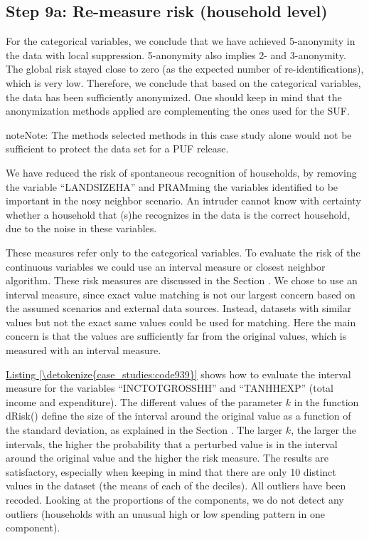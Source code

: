 \documentclass[letterpaper,10pt,english]{sphinxmanual}
\begin{document}
\subsection{Step 9a: Re-measure risk (household level)}
\label{\detokenize{case_studies:step-9a-re-measure-risk-household-level}}
For the categorical variables, we conclude that we have achieved
5-anonymity in the data with local suppression. 5-anonymity also implies
2- and 3-anonymity. The global risk stayed close to zero (as the
expected number of re-identifications), which is very low. Therefore, we
conclude that based on the categorical variables, the data has been
sufficiently anonymized. One should keep in mind that the anonymization
methods applied are complementing the ones used for the SUF.

\begin{sphinxadmonition}{note}{Note:}
The methods selected methods in this case study alone would not be
sufficient to protect the data set for a PUF release.
\end{sphinxadmonition}

We have reduced the risk of spontaneous recognition of households, by
removing the variable “LANDSIZEHA” and PRAMming the variables identified
to be important in the nosy neighbor scenario. An intruder cannot know
with certainty whether a household that (s)he recognizes in the data is
the correct household, due to the noise in these variables.

These measures refer only to the categorical variables. To evaluate the
risk of the continuous variables we could use an interval measure or
closest neighbor algorithm. These risk measures are discussed in the Section
.
We chose to use an interval measure, since exact value matching is
not our largest concern based on the assumed scenarios and external data
sources. Instead, datasets with similar values but not the exact same
values could be used for matching. Here the main concern is that the
values are sufficiently far from the original values, which is measured
with an interval measure.

\hyperref[\detokenize{case_studies:code939}]{Listing \ref{\detokenize{case_studies:code939}}} shows how to evaluate the interval measure for the
variables “INCTOTGROSSHH” and “TANHHEXP” (total income and expenditure).
The different values of the parameter \(k\) in the function dRisk()
define the size of the interval around the original value as a function
of the standard deviation, as explained in the Section
 . The larger
\(k\), the larger the intervals, the higher the probability that a
perturbed value is in the interval around the original value and the
higher the risk measure. The results are satisfactory, especially when
keeping in mind that there are only 10 distinct values in the dataset
(the means of each of the deciles). All outliers have been recoded.
Looking at the proportions of the components, we do not detect any
outliers (households with an unusual high or low spending pattern in one
component).
\end{document}
